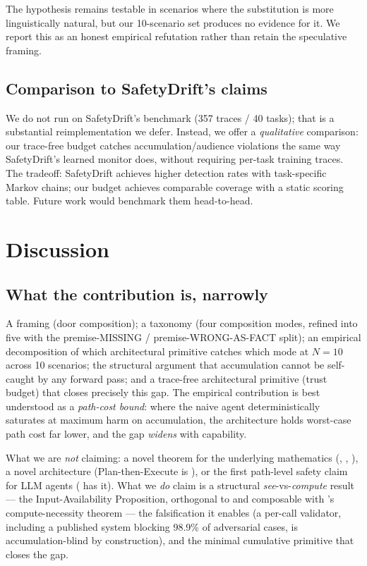 \documentclass[11pt]{article}
\begin{document}
The hypothesis remains testable in scenarios where the substitution is more linguistically natural, but our 10-scenario set produces no evidence for it. We report this as an honest empirical refutation rather than retain the speculative framing.

\subsection{Comparison to SafetyDrift's claims}

We do not run on SafetyDrift's benchmark (357 traces / 40 tasks); that is a substantial reimplementation we defer. Instead, we offer a \emph{qualitative} comparison: our trace-free budget catches accumulation/audience violations the same way SafetyDrift's learned monitor does, without requiring per-task training traces. The tradeoff: SafetyDrift achieves higher detection rates with task-specific Markov chains; our budget achieves comparable coverage with a static scoring table. Future work would benchmark them head-to-head.

\section{Discussion}

\subsection{What the contribution is, narrowly}

A framing (door composition); a taxonomy (four composition modes, refined into five with the premise-MISSING / premise-WRONG-AS-FACT split); an empirical decomposition of which architectural primitive catches which mode at $N = 10$ across 10 scenarios; the structural argument that accumulation cannot be self-caught by any forward pass; and a trace-free architectural primitive (trust budget) that closes precisely this gap. The empirical contribution is best understood as a \emph{path-cost bound}: where the naive agent deterministically saturates at maximum harm on accumulation, the architecture holds worst-case path cost far lower, and the gap \emph{widens} with capability.

What we are \emph{not} claiming: a novel theorem for the underlying mathematics (\citealt{arthur1989}, \citealt{krakovna2018}, \citealt{garcia1987sagas}), a novel architecture (Plan-then-Execute is \citealt{delrosario2025planex}), or the first path-level safety claim for LLM agents (\citealt{dhodapkar2026safetydrift} has it). What we \emph{do} claim is a structural \emph{see}-vs-\emph{compute} result --- the Input-Availability Proposition, orthogonal to and composable with \citet{mccann2026governance}'s compute-necessity theorem --- the falsification it enables (a per-call validator, including a published system blocking 98.9\% of adversarial cases, is accumulation-blind by construction), and the minimal cumulative primitive that closes the gap.
\end{document}
